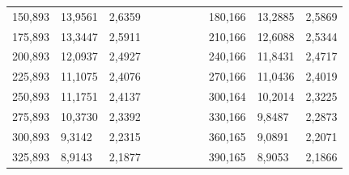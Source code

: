 \documentclass[a4paper,12pt]{article} %
\begin{document}
\begin{enumerate}
\begin{table}[h!]
\begin{tabular}{lllccllllll}
		\multicolumn{1}{|l|}{150,893} & \multicolumn{1}{l|}{13,9561} & \multicolumn{1}{l|}{2,6359}   &                      &                      &  &  & \multicolumn{1}{l|}{} & \multicolumn{1}{l|}{180,166} & \multicolumn{1}{l|}{13,2885} & \multicolumn{1}{l|}{2,5869}   \\ \cline{1-3} \cline{9-11} 
		\multicolumn{1}{|l|}{175,893} & \multicolumn{1}{l|}{13,3447} & \multicolumn{1}{l|}{2,5911}   &                      &                      &  &  & \multicolumn{1}{l|}{} & \multicolumn{1}{l|}{210,166} & \multicolumn{1}{l|}{12,6088} & \multicolumn{1}{l|}{2,5344}   \\ \cline{1-3} \cline{9-11} 
		\multicolumn{1}{|l|}{200,893} & \multicolumn{1}{l|}{12,0937} & \multicolumn{1}{l|}{2,4927}   &                      &                      &  &  & \multicolumn{1}{l|}{} & \multicolumn{1}{l|}{240,166} & \multicolumn{1}{l|}{11,8431} & \multicolumn{1}{l|}{2,4717}   \\ \cline{1-3} \cline{9-11} 
		\multicolumn{1}{|l|}{225,893} & \multicolumn{1}{l|}{11,1075} & \multicolumn{1}{l|}{2,4076}   &                      &                      &  &  & \multicolumn{1}{l|}{} & \multicolumn{1}{l|}{270,166} & \multicolumn{1}{l|}{11,0436} & \multicolumn{1}{l|}{2,4019}   \\ \cline{1-3} \cline{9-11} 
		\multicolumn{1}{|l|}{250,893} & \multicolumn{1}{l|}{11,1751} & \multicolumn{1}{l|}{2,4137}   &                      &                      &  &  & \multicolumn{1}{l|}{} & \multicolumn{1}{l|}{300,164} & \multicolumn{1}{l|}{10,2014} & \multicolumn{1}{l|}{2,3225}   \\ \cline{1-3} \cline{9-11} 
		\multicolumn{1}{|l|}{275,893} & \multicolumn{1}{l|}{10,3730} & \multicolumn{1}{l|}{2,3392}   &                      &                      &  &  & \multicolumn{1}{l|}{} & \multicolumn{1}{l|}{330,166} & \multicolumn{1}{l|}{9,8487}  & \multicolumn{1}{l|}{2,2873}   \\ \cline{1-3} \cline{9-11} 
		\multicolumn{1}{|l|}{300,893} & \multicolumn{1}{l|}{9,3142}  & \multicolumn{1}{l|}{2,2315}   &                      &                      &  &  & \multicolumn{1}{l|}{} & \multicolumn{1}{l|}{360,165} & \multicolumn{1}{l|}{9,0891}  & \multicolumn{1}{l|}{2,2071}   \\ \cline{1-3} \cline{9-11} 
		\multicolumn{1}{|l|}{325,893} & \multicolumn{1}{l|}{8,9143}  & \multicolumn{1}{l|}{2,1877}   &                      &                      &  &  & \multicolumn{1}{l|}{} & \multicolumn{1}{l|}{390,165} & \multicolumn{1}{l|}{8,9053}  & \multicolumn{1}{l|}{2,1866}   \\ \cline{1-3} \cline{9-11} 

\end{tabular}
\end{table}
\end{enumerate}
\end{document}
